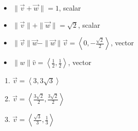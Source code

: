 \documentclass{ximera}
\begin{document}
\begin{enumerate}
\begin{multicols}{2}
\begin{itemize}
\end{itemize}

\end{multicols}

\begin{multicols}{2}

\begin{itemize}

\item $\| \vec{v} + \vec{w} \| = 1$, scalar
\item  $\| \vec{v} \| + \| \vec{w}\| = \sqrt{2}$, scalar

\end{itemize}

\end{multicols}

\begin{multicols}{2}

\begin{itemize}

\item $\| \vec{v} \| \vec{w} - \| \vec{w} \| \vec{v}  = \left<0,-\frac{\sqrt{2}}{2}\right>$, vector
\item $\|w\| \hat{v}= \left<\frac{1}{2}, \frac{1}{2}\right>$, vector

\end{itemize}

\end{multicols}

\setcounter{HW}{\value{enumi}}

\end{enumerate}

\begin{multicols}{3}

\begin{enumerate}

\setcounter{enumi}{\value{HW}}

\item $\vec{v} = \left<3,3\sqrt{3}\right>$
\item $\vec{v} = \left<\frac{3\sqrt{2}}{2},\frac{3\sqrt{2}}{2}\right>$
\item $\vec{v} = \left< \frac{\sqrt{3}}{3}, \frac{1}{3}\right>$

\setcounter{HW}{\value{enumi}}

\end{enumerate}

\end{multicols}
\end{document}
